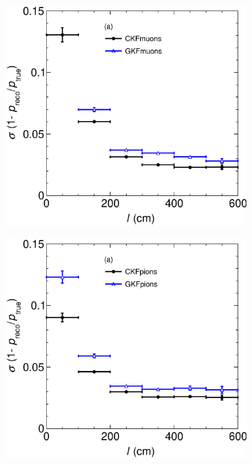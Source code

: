 \begin{figure}[t]
     \centering
     \begin{subfigure}{0.32\textwidth}
         \centering
         \includegraphics[width=\textwidth]{figures/ch5-KF_NDGAr/FullSample/Int/pRes/2D/RespVSLength_13.eps}
         \caption{}
         \label{fig:pResVSLength13_Int}
     \end{subfigure}
     \begin{subfigure}{0.32\textwidth}
         \centering
         \includegraphics[width=\textwidth]{figures/ch5-KF_NDGAr/FullSample/Int/pRes/2D/RespVSLength_211.eps}

\end{subfigure}
\end{figure}
